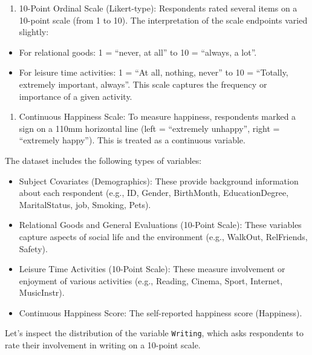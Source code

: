 \documentclass[
  letterpaper,
  DIV=11,
  numbers=noendperiod]{scrartcl}
\providecommand{\tightlist}{%
  \setlength{\itemsep}{0pt}\setlength{\parskip}{0pt}}\usepackage{longtable,booktabs,array}
\begin{document}
\begin{enumerate}
\def\labelenumi{\arabic{enumi}.}
\tightlist
\item
  10-Point Ordinal Scale (Likert-type): Respondents rated several items
  on a 10-point scale (from 1 to 10). The interpretation of the scale
  endpoints varied slightly:
\end{enumerate}

\begin{itemize}
\item
  For relational goods: 1 = ``never, at all'' to 10 = ``always, a lot''.
\item
  For leisure time activities: 1 = ``At all, nothing, never'' to 10 =
  ``Totally, extremely important, always''. This scale captures the
  frequency or importance of a given activity.
\end{itemize}

\begin{enumerate}
\def\labelenumi{\arabic{enumi}.}
\setcounter{enumi}{1}
\tightlist
\item
  Continuous Happiness Scale: To measure happiness, respondents marked a
  sign on a 110mm horizontal line (left = ``extremely unhappy'', right =
  ``extremely happy''). This is treated as a continuous variable.
\end{enumerate}

The dataset includes the following types of variables:

\begin{itemize}
\item
  Subject Covariates (Demographics): These provide background
  information about each respondent (e.g., ID, Gender, BirthMonth,
  EducationDegree, MaritalStatus, job, Smoking, Pets).
\item
  Relational Goods and General Evaluations (10-Point Scale): These
  variables capture aspects of social life and the environment (e.g.,
  WalkOut, RelFriends, Safety).
\item
  Leisure Time Activities (10-Point Scale): These measure involvement or
  enjoyment of various activities (e.g., Reading, Cinema, Sport,
  Internet, MusicInstr).
\item
  Continuous Happiness Score: The self-reported happiness score
  (Happiness).
\end{itemize}

Let's inspect the distribution of the variable \texttt{Writing}, which
asks respondents to rate their involvement in writing on a 10-point
scale.
\end{document}
